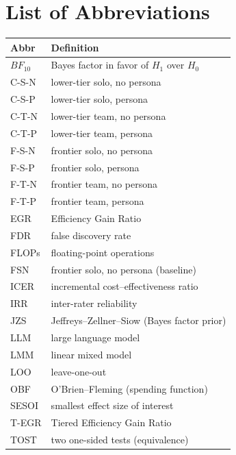 \documentclass[12pt,a4paper]{article}
\newcommand{\BF}{\ensuremath{\mathit{BF}}}
\begin{document}
\section*{List of Abbreviations}
\small
\begin{longtable}{@{}ll@{}}
\toprule
\textbf{Abbr} & \textbf{Definition} \\
\midrule
$\BF_{10}$        & Bayes factor in favor of $H_1$ over $H_0$ \\
C-S-N             & lower-tier solo, no persona \\
C-S-P             & lower-tier solo, persona \\
C-T-N             & lower-tier team, no persona \\
C-T-P             & lower-tier team, persona \\
F-S-N             & frontier solo, no persona \\
F-S-P             & frontier solo, persona \\
F-T-N             & frontier team, no persona \\
F-T-P             & frontier team, persona \\
EGR               & Efficiency Gain Ratio \\
FDR               & false discovery rate \\
FLOPs             & floating-point operations \\
FSN               & frontier solo, no persona (baseline) \\
ICER              & incremental cost--effectiveness ratio \\
IRR               & inter-rater reliability \\
JZS               & Jeffreys--Zellner--Siow (Bayes factor prior) \\
LLM               & large language model \\
LMM               & linear mixed model \\
LOO               & leave-one-out \\
OBF               & O'Brien--Fleming (spending function) \\
SESOI             & smallest effect size of interest \\
T-EGR             & Tiered Efficiency Gain Ratio \\
TOST              & two one-sided tests (equivalence) \\
\bottomrule
\end{longtable}
\normalsize
\end{document}
